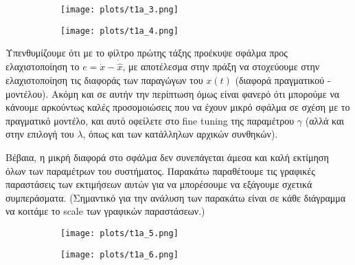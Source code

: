 \documentclass[12pt]{article} %
\numberwithin{equation}{section}  %
\begin{document}
\begin{figure}[h!]
    \begin{subfigure}{0.45\textwidth}
        \centering
        \texttt{[image: plots/t1a\_3.png]}
        \caption{}
        \label{fig:t1a_3}
    \end{subfigure}
    \hfill
    \begin{subfigure}{0.45\textwidth}
        \centering
        \texttt{[image: plots/t1a\_4.png]}
        \caption{}
        \label{fig:t1a_4}
    \end{subfigure}

\end{figure}

Υπενθυμίζουμε ότι με το φίλτρο πρώτης τάξης προέκυψε σφάλμα προς ελαχιστοποίηση το $e = \dot{x} - \dot{\hat{x}}$, με αποτέλεσμα στην πράξη να στοχεύουμε στην ελαχιστοποίηση τις διαφοράς των παραγώγων του $x(t)$ (διαφορά πραγματικού - μοντέλου). Ακόμη και σε αυτήν την περίπτωση όμως είναι φανερό ότι μπορούμε να κάνουμε αρκούντως καλές προσομοιώσεις που να έχουν μικρό σφάλμα σε σχέση με το πραγματικό μοντέλο, και αυτό οφείλετε στο fine tuning της παραμέτρου $\gamma$ (αλλά και στην επιλογή του $\lambda$, όπως και των κατάλληλων αρχικών συνθηκών). 

Βέβαια, η μικρή διαφορά στο σφάλμα δεν συνεπάγεται άμεσα και καλή εκτίμηση όλων των παραμέτρων του συστήματος. Παρακάτω παραθέτουμε τις γραφικές παραστάσεις των εκτιμήσεων αυτών για να μπορέσουμε να εξάγουμε σχετικά συμπεράσματα. (Σημαντικό για την ανάλυση των παρακάτω είναι σε κάθε διάγραμμα να κοιτάμε το scale των γραφικών παραστάσεων.)

\begin{figure}[h!]
    \begin{subfigure}{0.45\textwidth}
        \centering
        \texttt{[image: plots/t1a\_5.png]}
        \caption{}
        \label{fig:t1a_5}
    \end{subfigure}
    \hfill
    \begin{subfigure}{0.45\textwidth}
        \centering
        \texttt{[image: plots/t1a\_6.png]}
        \caption{}
        \label{fig:t1a_6}
    \end{subfigure}

\end{figure}
\end{document}
